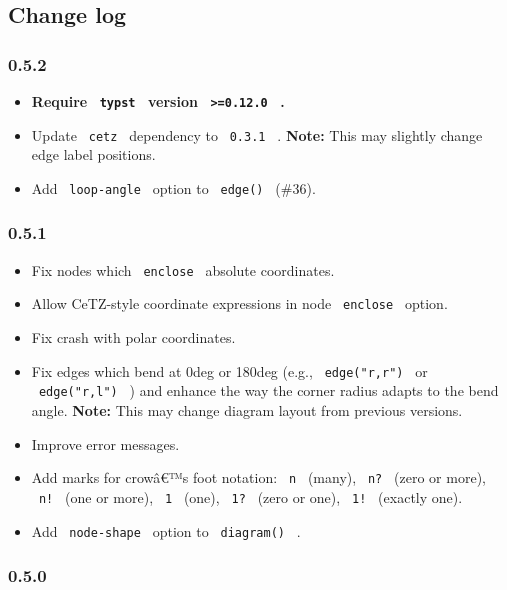 \subsection{Change log}\label{change-log}

\subsubsection{0.5.2}\label{section}

\begin{itemize}
\tightlist
\item
  \textbf{Require \texttt{\ typst\ } version
  \texttt{\ \textgreater{}=0.12.0\ } .}
\item
  Update \texttt{\ cetz\ } dependency to \texttt{\ 0.3.1\ } .
  \textbf{Note:} This may slightly change edge label positions.
\item
  Add \texttt{\ loop-angle\ } option to \texttt{\ edge()\ } (\#36).
\end{itemize}

\subsubsection{0.5.1}\label{section-1}

\begin{itemize}
\tightlist
\item
  Fix nodes which \texttt{\ enclose\ } absolute coordinates.
\item
  Allow CeTZ-style coordinate expressions in node \texttt{\ enclose\ }
  option.
\item
  Fix crash with polar coordinates.
\item
  Fix edges which bend at 0deg or 180deg (e.g., \texttt{\ edge("r,r")\ }
  or \texttt{\ edge("r,l")\ } ) and enhance the way the corner radius
  adapts to the bend angle. \textbf{Note:} This may change diagram
  layout from previous versions.
\item
  Improve error messages.
\item
  Add marks for crowâ€™s foot notation: \texttt{\ n\ } (many),
  \texttt{\ n?\ } (zero or more), \texttt{\ n!\ } (one or more),
  \texttt{\ 1\ } (one), \texttt{\ 1?\ } (zero or one), \texttt{\ 1!\ }
  (exactly one).
\item
  Add \texttt{\ node-shape\ } option to \texttt{\ diagram()\ } .
\end{itemize}

\subsubsection{0.5.0}\label{section-2}

